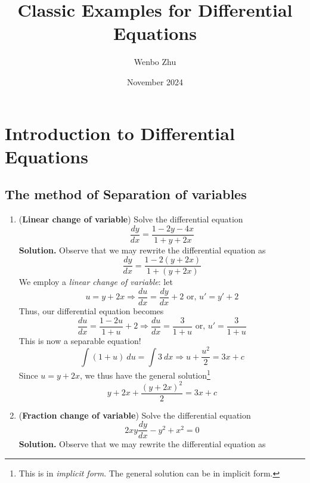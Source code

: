 \documentclass[a4paper]{article}
\title{Classic Examples for Differential Equations}
\author{Wenbo Zhu}
\date{November 2024}
\begin{document}
\maketitle

\section{Introduction to Differential Equations}
\subsection{The method of Separation of variables}
\begin{enumerate}
    \item (\textbf{Linear change of variable}) Solve the differential equation
    \begin{equation}
        \frac{dy}{dx}=\frac{1-2y-4x}{1+y+2x}
    \end{equation}
    \textbf{Solution.} Observe that we may rewrite the differential equation as
    \begin{equation*}
        \frac{dy}{dx}=\frac{1-2(y+2x)}{1+(y+2x)}
    \end{equation*}
    We employ a \textit{linear change of variable}: let
    \begin{equation*}
        u=y+2x\Rightarrow \frac{du}{dx}=\frac{dy}{dx}+2 \text{ or, }u'=y'+2
    \end{equation*}
    Thus, our differential equation becomes
    \begin{equation*}
        \frac{du}{dx}=\frac{1-2u}{1+u}+2\Rightarrow\frac{du}{dx}=\frac{3}{1+u} \text{ or, }u'=\frac{3}{1+u}
    \end{equation*}
    This is now a separable equation!
    \begin{equation*}
        \int(1+u)~du=\int3~dx\Rightarrow u+\frac{u^2}{2}=3x+c
    \end{equation*}
    Since $u=y+2x$, we thus have the general solution\footnote{This is in \textit{implicit form}. The general solution can be in implicit form.}
    \begin{equation*}
        y+2x+\frac{(y+2x)^2}{2}=3x+c
    \end{equation*}
    \newpage
    \item (\textbf{Fraction change of variable}) Solve the differential equation
    \begin{equation}
        2xy\frac{dy}{dx}-y^2+x^2=0
    \end{equation}
    \textbf{Solution.} Observe that we may rewrite the differential equation as

\end{enumerate}
\end{document}
